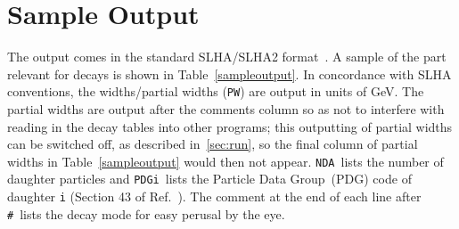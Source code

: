 \documentclass[final,3p,times,pdflatex]{elsarticle}
\def\code#1{{\tt #1}}
\begin{document}
\section{Sample Output} \label{sec:out}
The output comes in the standard SLHA/SLHA2
format~\cite{Skands:2003cj,Allanach:2008qq}. A sample of the part relevant for
decays is shown in Table~\ref{sampleoutput}. In concordance with SLHA conventions, the widths/partial widths
(\code{PW}) are output 
in units 
of GeV. The partial widths are output after the comments column so as not to interfere
with reading in the decay tables into other programs; this outputting of partial widths can be switched off,
as described in~\ref{sec:run}, so the final column of partial widths in Table~\ref{sampleoutput} would then not appear.
\code{NDA}~lists the number of daughter particles and
\code{PDGi}~lists the
Particle Data Group~(PDG) code of daughter \code{i} (Section 43 of
Ref.~\cite{Olive:2016xmw}). 
The comment at the end of each line after \code{\#}~lists the decay
mode for easy perusal by the eye.
\end{document}
